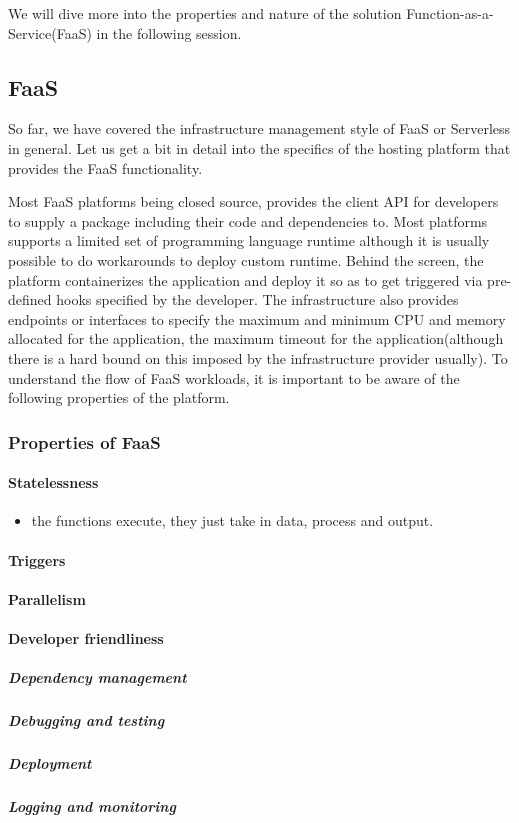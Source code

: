 \documentclass[12pt,titlepage]{article}
\begin{document}
We will dive more into the properties and nature of the solution
Function-as-a-Service(FaaS) in the following session. 

\subsection{FaaS}
\label{sec:org822f92d}
So far, we have covered the infrastructure management style of FaaS or
Serverless in general. Let us get a bit in detail into the specifics of the
hosting platform that provides the FaaS functionality.

Most FaaS platforms being closed source, provides the client API for developers
to supply a package including their code and dependencies to. Most platforms
supports a limited set of programming language runtime although it is usually
possible to do workarounds to deploy custom runtime. Behind the screen,
the platform containerizes the application and deploy it so as to get triggered
via pre-defined hooks specified by the developer. The infrastructure also provides endpoints or
interfaces to specify the maximum and minimum CPU and memory allocated for the
application, the maximum timeout for the application(although there is a
hard bound on this imposed by the infrastructure provider usually). To
understand the flow of FaaS workloads, it is important to be aware of the
following properties of the platform.

\subsubsection{Properties of FaaS}
\label{sec:orga963f6b}
\paragraph{Statelessness}
\label{sec:org7a847da}
\begin{itemize}
\item the functions execute, they just take in data, process and output.
\end{itemize}
\paragraph{Triggers}
\label{sec:org48a8be1}
\paragraph{Parallelism}
\label{sec:orgf6d4226}
\paragraph{Developer friendliness}
\label{sec:org80fcbb0}
\subparagraph{Dependency management}
\label{sec:orgba2065a}
\subparagraph{Debugging and testing}
\label{sec:orgb425ffd}
\subparagraph{Deployment}
\label{sec:orgdfd3c44}
\subparagraph{Logging and monitoring}
\label{sec:org5fcd3ec}
\end{document}
